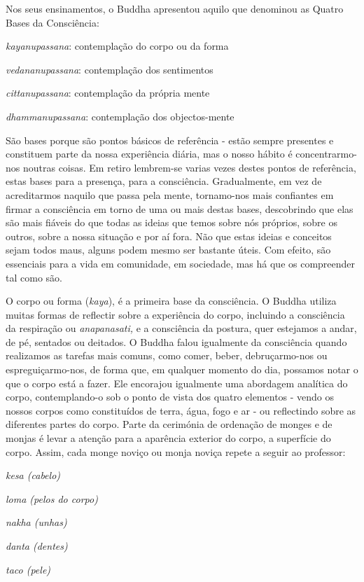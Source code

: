 Nos seus ensinamentos, o Buddha apresentou aquilo que denominou as
Quatro Bases da Consciência:

\emph{kayanupassana}: contemplação do corpo ou da forma

\emph{vedananupassana}: contemplação dos sentimentos

\emph{cittanupassana}: contemplação da própria mente

\emph{dhammanupassana}: contemplação dos objectos-mente

São bases porque são pontos básicos de referência - estão sempre
presentes e constituem parte da nossa experiência diária, mas o nosso
hábito é concentrarmo-nos noutras coisas. Em retiro lembrem-se varias
vezes destes pontos de referência, estas bases para a presença, para a
consciência. Gradualmente, em vez de acreditarmos naquilo que passa pela
mente, tornamo-nos mais confiantes em firmar a consciência em torno de
uma ou mais destas bases, descobrindo que elas são mais fiáveis do que
todas as ideias que temos sobre nós próprios, sobre os outros, sobre a
nossa situação e por aí fora. Não que estas ideias e conceitos sejam
todos maus, alguns podem mesmo ser bastante úteis. Com efeito, são
essenciais para a vida em comunidade, em sociedade, mas há que os
compreender tal como são.

O corpo ou forma (\emph{kaya}), é a primeira base da consciência. O
Buddha utiliza muitas formas de reflectir sobre a experiência do corpo,
incluindo a consciência da respiração ou \emph{anapanasati,} e a
consciência da postura, quer estejamos a andar, de pé, sentados ou
deitados. O Buddha falou igualmente da consciência quando realizamos as
tarefas mais comuns, como comer, beber, debruçarmo-nos ou
espreguiçarmo-nos, de forma que, em qualquer momento do dia, possamos
notar o que o corpo está a fazer. Ele encorajou igualmente uma abordagem
analítica do corpo, contemplando-o sob o ponto de vista dos quatro
elementos - vendo os nossos corpos como constituídos de terra, água,
fogo e ar - ou reflectindo sobre as diferentes partes do corpo. Parte da
cerimónia de ordenação de monges e de monjas é levar a atenção para a
aparência exterior do corpo, a superfície do corpo. Assim, cada monge
noviço ou monja noviça repete a seguir ao professor:

\emph{kesa (cabelo)}

\emph{loma (pelos do corpo)}

\emph{nakha (unhas)}

\emph{danta (dentes)}

\emph{taco (pele)}

